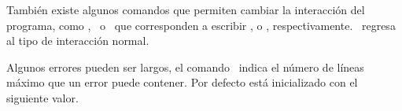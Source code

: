 También existe algunos comandos que permiten cambiar la interacción del programa, como \texcs\scrollmode, \texcs\nonstopmode\ o \texcs\batchmode\ que corresponden a escribir ,  o , respectivamente. \texcs\errorstopmode\ regresa al tipo de interacción normal.

Algunos errores pueden ser largos, el comando \texcs\errorcontextlines\ indica el número de líneas máximo que un error puede contener. Por defecto está inicializado con el siguiente valor.
\begin{texcode}
\end{texcode}
